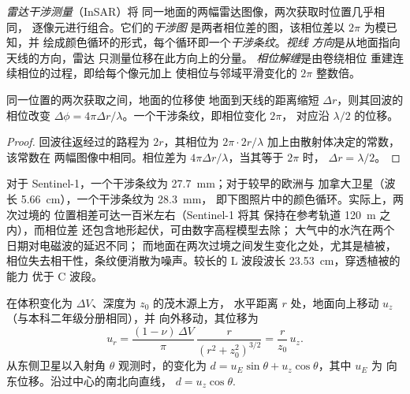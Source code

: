 \begin{definition}\label{def:b3:remote-sensing-gis:insar}
\emph{雷达干涉测量}（InSAR）将
同一地面的两幅雷达图像，两次获取时位置几乎相同，
逐像元进行组合。它们的\emph{干涉图}
是两者相位差的图，该相位差以 $2\pi$ 为模已知，并
绘成颜色循环的形式，每个循环即一个\emph{干涉条纹}。\emph{视线
方向}是从地面指向天线的方向，雷达
只测量位移在此方向上的分量。
\emph{相位解缠}是由卷绕相位
重建连续相位的过程，即给每个像元加上
使相位与邻域平滑变化的 $2\pi$ 整数倍。
\end{definition}

\begin{theorem}[一个干涉条纹]\label{thm:b3:remote-sensing-gis:fringe}
同一位置的两次获取之间，地面的位移使
地面到天线的距离缩短 $\Delta r$，则其回波的
相位改变 $\Delta\phi = 4\pi\Delta r/\lambda$。一个干涉条纹，即相位变化 $2\pi$，
对应沿 $\lambda/2$ 的位移。
\end{theorem}

\begin{proof}
回波往返经过的路程为 $2r$，其相位为
$2\pi\cdot 2r/\lambda$ 加上由散射体决定的常数，该常数在
两幅图像中相同。相位差为 $4\pi\Delta r/\lambda$，当其等于 $2\pi$ 时，
$\Delta r = \lambda/2$。
\end{proof}

对于 Sentinel-1，一个干涉条纹为 \qty{27.7}{mm}；对于较早的欧洲与
加拿大卫星（波长 \qty{5.66}{cm}），一个干涉条纹为 \qty{28.3}{mm}，
即下图照片中的颜色循环。实际上，两次过境的
位置相差可达一百米左右（Sentinel-1 将其
保持在参考轨道 \qty{120}{m} 之内），而相位差
还包含地形起伏，可由数字高程模型去除；
大气中的水汽在两个日期对电磁波的延迟不同；
而地面在两次过境之间发生变化之处，尤其是植被，
相位失去相干性，条纹便消散为噪声。较长的
L 波段波长 \qty{23.53}{cm}，穿透植被的能力
优于 C 波段。

\begin{proposition}[沿视线方向所见的茂木源]\label{prop:b3:remote-sensing-gis:mogi-los}
在体积变化为 $\Delta V$、深度为 $z_0$ 的茂木源上方，
水平距离 $r$ 处，地面向上移动 $u_z$（与本科二年级分册相同），并
向外移动，其位移为
\[
u_r = \frac{(1 - \nu)\,\Delta V}{\pi}\,\frac{r}{(r^2 + z_0^2)^{3/2}} = \frac{r}{z_0}\,u_z .
\]
从东侧卫星以入射角 $\theta$ 观测时，的变化为
$d = u_E\sin\theta + u_z\cos\theta$，其中 $u_E$ 为
向东位移。沿过中心的南北向直线，
$d = u_z\cos\theta$.
\end{proposition}

